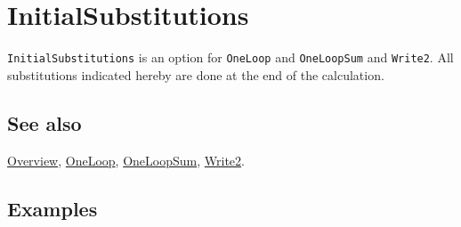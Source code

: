 \documentclass[../FeynCalcManual.tex]{subfiles}
\begin{document}
\hypertarget{initialsubstitutions}{
\section{InitialSubstitutions}\label{initialsubstitutions}}

\texttt{InitialSubstitutions} is an option for \texttt{OneLoop} and
\texttt{OneLoopSum} and \texttt{Write2}. All substitutions indicated
hereby are done at the end of the calculation.

\subsection{See also}

\hyperlink{toc}{Overview}, \hyperlink{oneloop}{OneLoop},
\hyperlink{oneloopsum}{OneLoopSum}, \hyperlink{write2}{Write2}.

\subsection{Examples}
\end{document}
